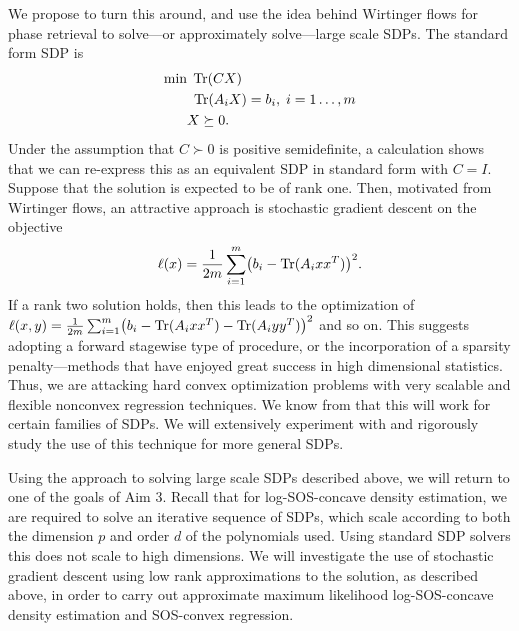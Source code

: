 We propose to turn this around, and use the idea behind Wirtinger
flows for phase retrieval to solve---or approximately solve---large
scale SDPs.  The standard form SDP is
\begin{align*}
\min &\; \mathop{\rm Tr}(CX) \\
       &\ \mathop{\rm Tr}(A_i X) = b_i, \; i=1\ldots, m \\
       & X \succeq 0.
\end{align*}
Under the assumption that $C\succ 0$ is positive semidefinite, a
calculation shows that we can re-express this as an equivalent SDP
in standard form with $C=I$.
Suppose that the solution is expected to be of rank one.
Then, motivated from Wirtinger flows, an attractive 
approach is stochastic gradient descent on the
objective
$$\ell(x) = \frac{1}{2m} \sum_{i=1}^m \bigl(b_i - \mathop{\rm Tr}(A_i xx^T)\bigr)^2.$$
If a rank two solution holds, then this leads to the optimization of
$\ell(x,y) = \frac{1}{2m} \sum_{i=1}^m \bigl(b_i - \mathop{\rm Tr}(A_i xx^T)- \mathop{\rm Tr}(A_i yy^T)\bigr)^2$
and so on.  This suggests adopting a forward stagewise type of
procedure, or the incorporation of a sparsity penalty---methods that
have enjoyed great success in high dimensional statistics. Thus, we are
attacking hard convex optimization problems with very scalable and
flexible nonconvex regression techniques.  We know from
\cite{candes:14} that this will work for certain families of SDPs.  We
will extensively experiment with and rigorously study the
use of this technique for more general SDPs.



Using the approach to solving large scale SDPs described above, we
will return to one of the goals of Aim 3.
Recall that for log-SOS-concave
density estimation, we are required to solve an iterative
sequence of SDPs, which scale according to both the dimension $p$
and order $d$ of the polynomials used.  Using standard SDP solvers
this does not scale to high dimensions.  We will
investigate the use of stochastic gradient descent using
low rank approximations to the solution, as described above,
in order to carry out approximate maximum likelihood log-SOS-concave
density estimation and SOS-convex regression.

%
